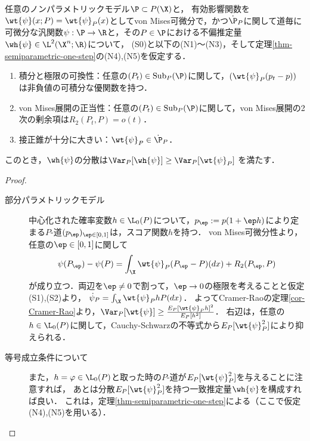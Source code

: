 \documentclass[uplatex, dvipdfmx]{jsarticle}
\newcommand{\Sub}{\mathrm{Sub}}
\begin{document}
\begin{theorem}[ノンパラメトリック一致推定量の最小分散]\label{thm-semiparametric-efficient-asymptotic-variance}
    任意のノンパラメトリックモデル$\P\subset P(\X)$と，
    有効影響関数を$\wt{\psi}(x;P)=\wt{\psi}_P(x)$としてvon Mises可微分で，かつ$\dot{\P}_P$に関して道毎に可微分な汎関数$\psi:\P\to\R$と，その$P\in\P$における不偏推定量$\wh{\psi}\in\L^2(\X^n;\R)$について，
    (S0)と以下の(N1)〜(N3)，そして定理\ref{thm-semiparametric-one-step}の(N4),(N5)を仮定する．
    \begin{enumerate}[({N}1)]
        \item 積分と極限の可換性：任意の$(P_t)\in\Sub_P(\P)$に関して，$(\wt{\psi}_P(p_t-p))$は非負値の可積分な優関数を持つ．
        \item von Mises展開の正当性：任意の$(P_t)\in\Sub_P(\P)$に関して，von Mises展開の2次の剰余項は$R_2(P_t,P)=o(t)$．
        \item 接正錐が十分に大きい：$\wt{\psi}_P\in\dot{\P}_P$．
    \end{enumerate}
    このとき，$\wh{\psi}$の分散は$\Var_P[\wh{\psi}]\ge\Var_P[\wt{\psi}_P]$
    を満たす．
\end{theorem}
\begin{proof}\mbox{}
    \begin{description}
        \item[部分パラメトリックモデル] 中心化された確率変数$h\in\L_0(P)$について，$p_\ep:=p(1+\ep h)$により定まる$P$-道$(p_\ep)_{\ep\in[0,1]}$は，スコア関数$h$を持つ．
        von Mises可微分性より，任意の$\ep\in[0,1]$に関して
        \[\psi(P_\ep)-\psi(P)=\int_\X\wt{\psi}_P(P_\ep-P)(dx)+R_2(P_\ep,P)\]
        が成り立つ．両辺を$\ep\ne0$で割って，$\ep\to0$の極限を考えることと仮定(S1),(S2)より，
        $\dot{\psi}_P=\int_\X\wt{\psi}_P hP(dx)$．
        よってCramer-Raoの定理\ref{cor-Cramer-Rao}より，$\Var_P[\wt{\psi}]\ge\frac{E_P[\wt{\psi}_Ph]^2}{E_P[h^2]}$．
        右辺は，任意の$h\in\L_0(P)$に関して，Cauchy-Schwarzの不等式から$E_P[\wt{\psi}_P^2]$により抑えられる．
        \item[等号成立条件について] 
        また，$h=\varphi\in\L_0(P)$と取った時の$P$-道が$E_P[\wt{\psi}_P^2]$を与えることに注意すれば，
        あとは分散$E_P[\wt{\psi}_P^2]$を持つ一致推定量$\wh{\psi}$を構成すれば良い．
        これは，定理\ref{thm-semiparametric-one-step}による（ここで仮定(N4),(N5)を用いる）．
    \end{description}
\end{proof}
\end{document}
